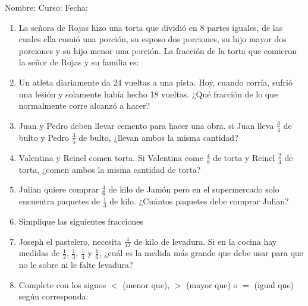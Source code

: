 \documentclass[letterpaper,fleqn]{article}
\newcommand{\LineaNombre}{%
\par
\vspace{\baselineskip}
Nombre:\hrulefill \; Curso: \underline{\hspace*{48pt}} \; Fecha: \underline{\hspace*{2.5cm}} \relax
\par}
\begin{document}
\LineaNombre
\begin{enumerate}
 \item La señora de Rojas hizo una torta que dividió en 8 partes iguales, de las cuales ella comió una porción, su esposo dos porciones, su hijo mayor dos porciones y su hijo menor una porción. La fracción de la torta que comieron la señor de Rojas y su familia es: \noanswer
 \item Un atleta diariamente da 24 vueltas a una pista. Hoy, cuando corría, sufrió una lesión y solamente había hecho 18 vueltas. ¿Qué  fracción de lo que normalmente corre alcanzó a hacer? \noanswer
\item Juan y Pedro deben llevar cemento para hacer una obra. si Juan lleva $\frac{3}{4}$ de bulto y Pedro $\frac{3}{5}$ de bulto, ¿llevan ambos la misma cantidad?\noanswer
\item Valentina y Reinel comen torta. Si Valentina come $\frac{4}{8}$ de torta y Reinel $\frac{2}{4}$ de torta, ¿comen ambos la misma cantidad de torta?\noanswer
\item Julian quiere comprar $\frac{4}{6}$ de kilo de Jamón pero en el supermercado solo encuentra  paquetes de $\frac{1}{3}$ de kilo. ¿Cuántos paquetes debe comprar Julian?\noanswer
\item Simplique las siguientes fracciones
\begin{enumerate}
\end{enumerate}
\item Joseph el pastelero, necesita $\frac{4}{12}$ de kilo de levadura. Si en la cocina hay medidas de $\frac{1}{2}$, $\frac{1}{3}$, $\frac{1}{4}$ y $\frac{1}{6}$, ¿cu\'{a}l es la medida m\'{a}s grande que debe usar para que no le sobre ni le falte levadura?\noanswer
\item Complete con los signos $<$ (menor que), $>$ (mayor que) o $=$ (igual que) según corresponda:
\begin{enumerate}
\end{enumerate}
\end{enumerate}
\end{document}
